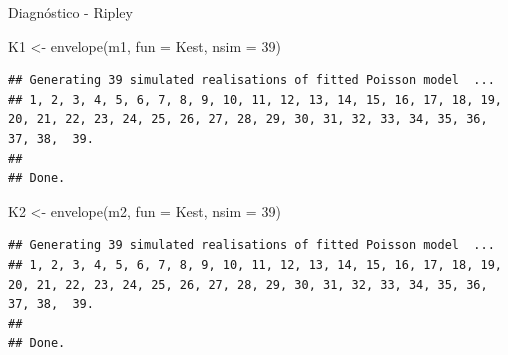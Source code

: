 \documentclass[
  11pt,
  ignorenonframetext,
]{beamer}
\newenvironment{Shaded}{}{}
\newcommand{\AttributeTok}[1]{\textcolor[rgb]{0.49,0.56,0.16}{#1}}
\newcommand{\DecValTok}[1]{\textcolor[rgb]{0.25,0.63,0.44}{#1}}
\newcommand{\FunctionTok}[1]{\textcolor[rgb]{0.02,0.16,0.49}{#1}}
\newcommand{\NormalTok}[1]{#1}
\newcommand{\OtherTok}[1]{\textcolor[rgb]{0.00,0.44,0.13}{#1}}
\begin{document}
\begin{frame}[fragile]{Diagnóstico - Ripley}
\protect\hypertarget{diagnuxf3stico---ripley}{}
\begin{Shaded}
\begin{Highlighting}[]
\NormalTok{K1 }\OtherTok{\textless{}{-}} \FunctionTok{envelope}\NormalTok{(m1, }\AttributeTok{fun =}\NormalTok{ Kest, }\AttributeTok{nsim =} \DecValTok{39}\NormalTok{)}
\end{Highlighting}
\end{Shaded}

\begin{verbatim}
## Generating 39 simulated realisations of fitted Poisson model  ...
## 1, 2, 3, 4, 5, 6, 7, 8, 9, 10, 11, 12, 13, 14, 15, 16, 17, 18, 19, 20, 21, 22, 23, 24, 25, 26, 27, 28, 29, 30, 31, 32, 33, 34, 35, 36, 37, 38,  39.
## 
## Done.
\end{verbatim}

\begin{Shaded}
\begin{Highlighting}[]
\NormalTok{K2 }\OtherTok{\textless{}{-}} \FunctionTok{envelope}\NormalTok{(m2, }\AttributeTok{fun =}\NormalTok{ Kest, }\AttributeTok{nsim =} \DecValTok{39}\NormalTok{)}
\end{Highlighting}
\end{Shaded}

\begin{verbatim}
## Generating 39 simulated realisations of fitted Poisson model  ...
## 1, 2, 3, 4, 5, 6, 7, 8, 9, 10, 11, 12, 13, 14, 15, 16, 17, 18, 19, 20, 21, 22, 23, 24, 25, 26, 27, 28, 29, 30, 31, 32, 33, 34, 35, 36, 37, 38,  39.
## 
## Done.
\end{verbatim}
\end{frame}
\end{document}
